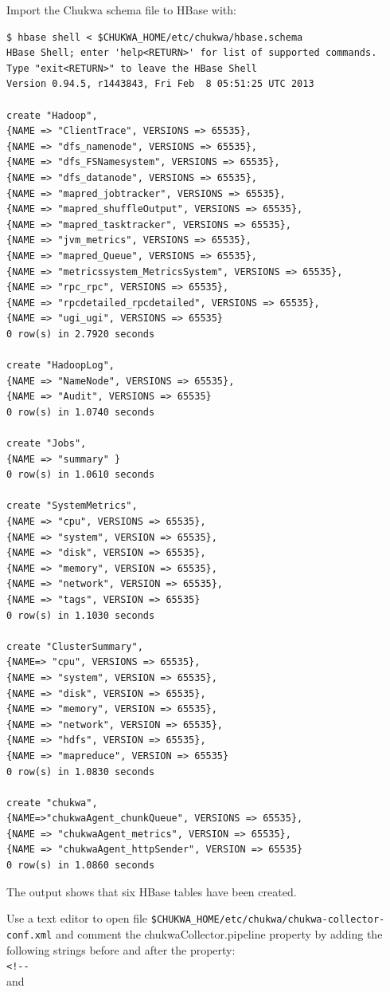 Import the Chukwa schema file to HBase with:
\lstset{style=bashstyle}
\begin{lstlisting}
$ hbase shell < $CHUKWA_HOME/etc/chukwa/hbase.schema
HBase Shell; enter 'help<RETURN>' for list of supported commands.
Type "exit<RETURN>" to leave the HBase Shell
Version 0.94.5, r1443843, Fri Feb  8 05:51:25 UTC 2013

create "Hadoop",
{NAME => "ClientTrace", VERSIONS => 65535},
{NAME => "dfs_namenode", VERSIONS => 65535},
{NAME => "dfs_FSNamesystem", VERSIONS => 65535},
{NAME => "dfs_datanode", VERSIONS => 65535},
{NAME => "mapred_jobtracker", VERSIONS => 65535},
{NAME => "mapred_shuffleOutput", VERSIONS => 65535},
{NAME => "mapred_tasktracker", VERSIONS => 65535},
{NAME => "jvm_metrics", VERSIONS => 65535},
{NAME => "mapred_Queue", VERSIONS => 65535},
{NAME => "metricssystem_MetricsSystem", VERSIONS => 65535},
{NAME => "rpc_rpc", VERSIONS => 65535},
{NAME => "rpcdetailed_rpcdetailed", VERSIONS => 65535},
{NAME => "ugi_ugi", VERSIONS => 65535}
0 row(s) in 2.7920 seconds

create "HadoopLog",
{NAME => "NameNode", VERSIONS => 65535},
{NAME => "Audit", VERSIONS => 65535}
0 row(s) in 1.0740 seconds

create "Jobs",
{NAME => "summary" }
0 row(s) in 1.0610 seconds

create "SystemMetrics",
{NAME => "cpu", VERSIONS => 65535},
{NAME => "system", VERSION => 65535},
{NAME => "disk", VERSION => 65535},
{NAME => "memory", VERSION => 65535},
{NAME => "network", VERSION => 65535},
{NAME => "tags", VERSION => 65535}
0 row(s) in 1.1030 seconds

create "ClusterSummary",
{NAME=> "cpu", VERSIONS => 65535},
{NAME => "system", VERSION => 65535},
{NAME => "disk", VERSION => 65535},
{NAME => "memory", VERSION => 65535},
{NAME => "network", VERSION => 65535},
{NAME => "hdfs", VERSION => 65535},
{NAME => "mapreduce", VERSION => 65535}
0 row(s) in 1.0830 seconds

create "chukwa",
{NAME=>"chukwaAgent_chunkQueue", VERSIONS => 65535},
{NAME => "chukwaAgent_metrics", VERSION => 65535},
{NAME => "chukwaAgent_httpSender", VERSION => 65535}
0 row(s) in 1.0860 seconds
\end{lstlisting}

The output shows that six HBase tables have been created.

Use a text editor to open file \verb|$CHUKWA_HOME/etc/chukwa/chukwa-collector-conf.xml| and comment the chukwaCollector.pipeline property by adding the following strings before and after the property: \\
\verb|<!--|\\
and

